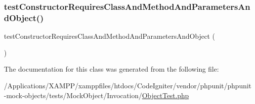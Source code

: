 \subsubsection{\texorpdfstring{test\+Constructor\+Requires\+Class\+And\+Method\+And\+Parameters\+And\+Object()}{testConstructorRequiresClassAndMethodAndParametersAndObject()}}
{\footnotesize\ttfamily test\+Constructor\+Requires\+Class\+And\+Method\+And\+Parameters\+And\+Object (\begin{DoxyParamCaption}{ }\end{DoxyParamCaption})}



The documentation for this class was generated from the following file\+:\begin{DoxyCompactItemize}
\item 
/\+Applications/\+X\+A\+M\+P\+P/xamppfiles/htdocs/\+Code\+Igniter/vendor/phpunit/phpunit-\/mock-\/objects/tests/\+Mock\+Object/\+Invocation/\mbox{\hyperlink{_object_test_8php}{Object\+Test.\+php}}\end{DoxyCompactItemize}
